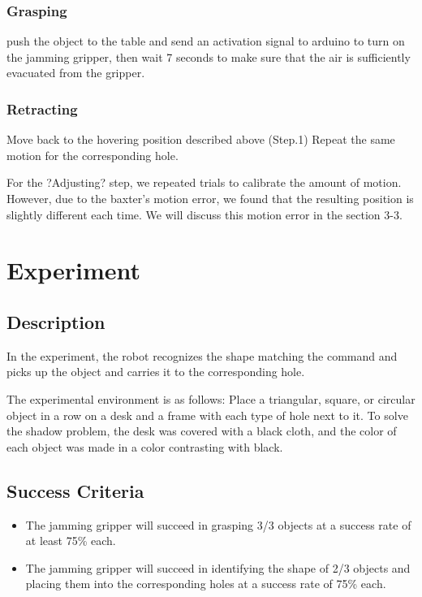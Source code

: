 \documentclass[conference,a4paper]{IEEEtran}
\begin{document}
\subsubsection{Grasping} push the object to the table and send an activation signal to arduino to turn on the jamming gripper, then wait 7 seconds to make sure that the air is sufficiently evacuated from the gripper.
\subsubsection{Retracting} Move back to the hovering position described above (Step.1)
Repeat the same motion for the corresponding hole.

For the ?Adjusting? step, we repeated trials to calibrate the amount of motion. However, due to the baxter's motion error, we found that the resulting position is slightly different each time. We will discuss this motion error in the section 3-3.



\section{Experiment}

\subsection{Description}
In the experiment, the robot recognizes the shape matching the command and picks up the object and carries it to the corresponding hole.
 
The experimental environment is as follows: Place a triangular, square, or circular object in a row on a desk and a frame with each type of hole next to it. To solve the shadow problem, the desk was covered with a black cloth, and the color of each object was made in a color contrasting with black.

\subsection{Success Criteria}
\begin{itemize}
\item The jamming gripper will succeed in grasping 3/3 objects at a success rate of at least 75\% each.
\item The jamming gripper will succeed in identifying the shape of 2/3 objects and placing them into the corresponding holes at a success rate of 75\% each.
\end{itemize}
\end{document}
